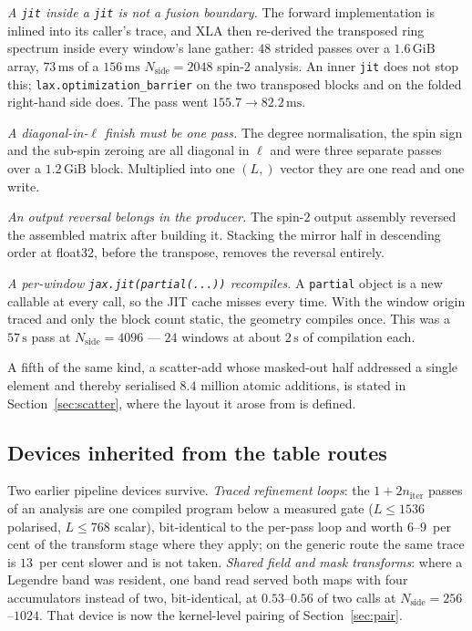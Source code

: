 \documentclass[usenatbib,useAMS]{mnras}
\begin{document}
\textit{A \texttt{jit} inside a \texttt{jit} is not a fusion boundary.} The forward implementation is inlined into its caller's trace, and XLA then re-derived the transposed ring spectrum inside every window's lane gather: $48$ strided passes over a $1.6\,\mathrm{GiB}$ array, $73\,\mathrm{ms}$ of a $156\,\mathrm{ms}$ $N_{\mathrm{side}}=2048$ spin-$2$ analysis. An inner \texttt{jit} does not stop this; \texttt{lax.optimization\_barrier} on the two transposed blocks and on the folded right-hand side does. The pass went $155.7\to82.2\,\mathrm{ms}$.

\textit{A diagonal-in-$\ell$ finish must be one pass.} The degree normalisation, the spin sign and the sub-spin zeroing are all diagonal in $\ell$ and were three separate passes over a $1.2\,\mathrm{GiB}$ block. Multiplied into one $(L,)$ vector they are one read and one write.

\textit{An output reversal belongs in the producer.} The spin-$2$ output assembly reversed the assembled matrix after building it. Stacking the mirror half in descending order at float32, before the transpose, removes the reversal entirely.

\textit{A per-window \texttt{jax.jit(partial(...))} recompiles.} A \texttt{partial} object is a new callable at every call, so the JIT cache misses every time. With the window origin traced and only the block count static, the geometry compiles once. This was a $57\,\mathrm{s}$ pass at $N_{\mathrm{side}}=4096$ --- $24$ windows at about $2\,\mathrm{s}$ of compilation each.

A fifth of the same kind, a scatter-add whose masked-out half addressed a single element and thereby serialised $8.4$ million atomic additions, is stated in Section~\ref{sec:scatter}, where the layout it arose from is defined.

\subsection{Devices inherited from the table routes}

Two earlier pipeline devices survive. \emph{Traced refinement loops}: the $1+2n_{\mathrm{iter}}$ passes of an analysis are one compiled program below a measured gate ($L\le1536$ polarised, $L\le768$ scalar), bit-identical to the per-pass loop and worth $6$--$9$~per cent of the transform stage where they apply; on the generic route the same trace is $13$~per cent slower and is not taken. \emph{Shared field and mask transforms}: where a Legendre band was resident, one band read served both maps with four accumulators instead of two, bit-identical, at $0.53$--$0.56$ of two calls at $N_{\mathrm{side}}=256$--$1024$. That device is now the kernel-level pairing of Section~\ref{sec:pair}.
\end{document}
